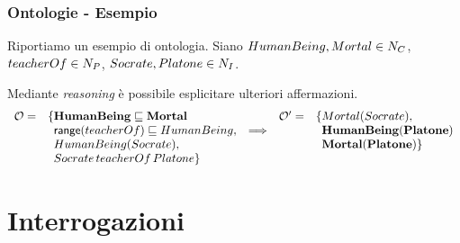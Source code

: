 \documentclass[8pt]{beamer}
\begin{document}
\begin{frame}
\frametitle{Ontologie - Esempio}
Riportiamo un esempio di ontologia. Siano $HumanBeing, Mortal \in N_C$,
$teacherOf \in N_P$, $Socrate, Platone \in N_I$.
\vspace{\baselineskip}

Mediante \emph{reasoning} \`e possibile esplicitare ulteriori 
affermazioni.
\[
 \begin{array}{clccl}
  \Ont  =  &\{\mathbf{HumanBeing \Issub Mortal} & &\Ontp = & \{Mortal(Socrate), \\
  &\phantom{\{}\range(teacherOf) \Issub HumanBeing, & \Longrightarrow && \phantom{\{}\mathbf{HumanBeing(Platone)}\\
  &\phantom{\{}HumanBeing(Socrate), &&&\phantom{\{}\mathbf{Mortal(Platone)} \}\\
  &\phantom{\{}Socrate\,teacherOf\,Platone \}\\
 \end{array}
\]
\end{frame}

\section{Interrogazioni}
\end{document}
